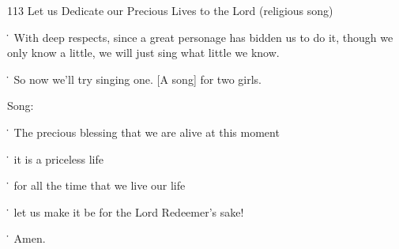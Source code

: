 
113 Let us Dedicate our Precious Lives to the Lord (religious song)

\. With deep respects, since a great personage has bidden us to do it, though we
only know a little, we will just sing what little we know.

\. So now we'll try singing one. [A song] for two girls.

Song:

\. The precious blessing that we are alive at this moment

\. it is a priceless life

\. for all the time that we live our life

\. let us make it be for the Lord Redeemer's sake!

\. Amen.


